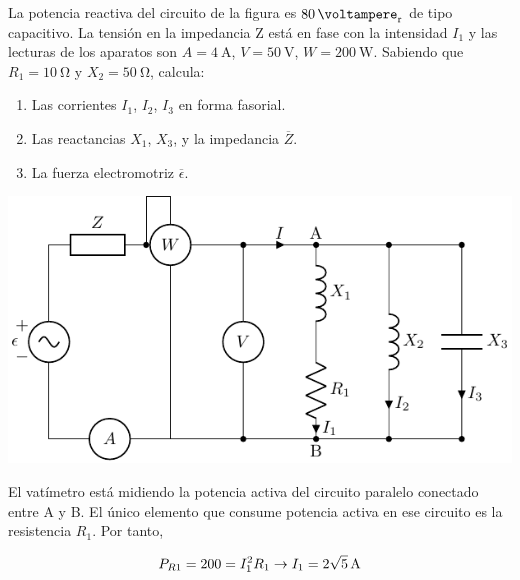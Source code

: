 \documentclass[12pt]{article}
\begin{document}

La potencia reactiva del circuito de la figura es $\SI{80}{\voltampere_r}$ de tipo capacitivo. La tensión en la impedancia Z está en fase con la intensidad $I_1$ y las lecturas de los aparatos son $A = \SI{4}{\ampere}$, $V = \SI{50}{\volt}$, $W = \SI{200}{\watt}$. Sabiendo que $R_1 = \SI{10}{\ohm}$ y $X_2 = \SI{50}{\ohm}$, calcula:

\begin{enumerate}
\item Las corrientes $I_1$, $I_2$, $I_3$ en forma fasorial.
\item Las reactancias $X_1$, $X_3$, y la impedancia $\overline{Z}$.
\item La fuerza electromotriz $\overline{\epsilon}$.
\end{enumerate}
\begin{center}
  \includegraphics{../figs/problema12}
\end{center}

El vatímetro está midiendo la potencia activa del circuito paralelo conectado entre A y B. El único elemento que consume potencia activa en ese circuito es la resistencia $R_1$. Por tanto,

\[
  P_{R1} = 200 = I_1^2 R_1 \rightarrow I_1 = \SI[parse-numbers=false]{2\sqrt{5}}{\ampere}
\]
\end{document}
